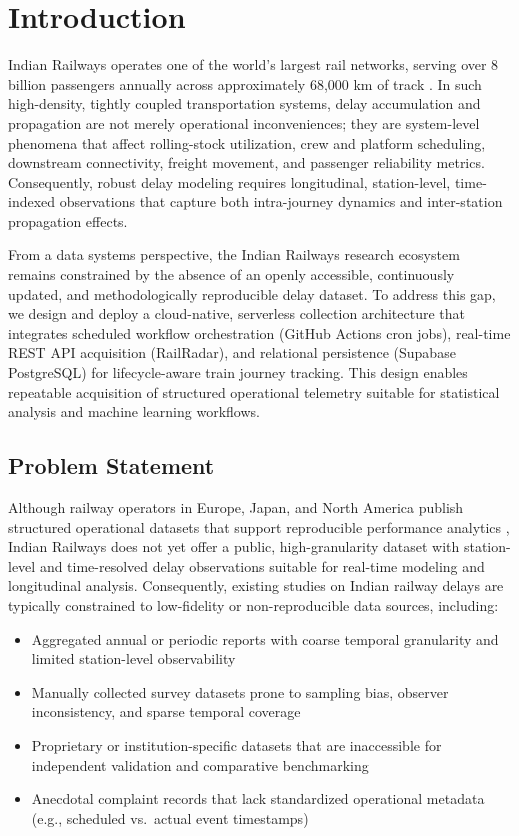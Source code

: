 \documentclass[conference]{IEEEtran}
\begin{document}
\section{Introduction}

Indian Railways operates one of the world's largest rail networks, serving over 8 billion passengers annually across approximately 68,000 km of track \cite{indian_railways_stats}. In such high-density, tightly coupled transportation systems, delay accumulation and propagation are not merely operational inconveniences; they are system-level phenomena that affect rolling-stock utilization, crew and platform scheduling, downstream connectivity, freight movement, and passenger reliability metrics. Consequently, robust delay modeling requires longitudinal, station-level, time-indexed observations that capture both intra-journey dynamics and inter-station propagation effects.

From a data systems perspective, the Indian Railways research ecosystem remains constrained by the absence of an openly accessible, continuously updated, and methodologically reproducible delay dataset. To address this gap, we design and deploy a cloud-native, serverless collection architecture that integrates scheduled workflow orchestration (GitHub Actions cron jobs), real-time REST API acquisition (RailRadar), and relational persistence (Supabase PostgreSQL) for lifecycle-aware train journey tracking. This design enables repeatable acquisition of structured operational telemetry suitable for statistical analysis and machine learning workflows.

\subsection{Problem Statement}

Although railway operators in Europe, Japan, and North America publish structured operational datasets that support reproducible performance analytics \cite{uk_rail_data, german_rail_data}, Indian Railways does not yet offer a public, high-granularity dataset with station-level and time-resolved delay observations suitable for real-time modeling and longitudinal analysis. Consequently, existing studies on Indian railway delays are typically constrained to low-fidelity or non-reproducible data sources, including:

\begin{itemize}
    \item Aggregated annual or periodic reports with coarse temporal granularity and limited station-level observability
    \item Manually collected survey datasets prone to sampling bias, observer inconsistency, and sparse temporal coverage
    \item Proprietary or institution-specific datasets that are inaccessible for independent validation and comparative benchmarking
    \item Anecdotal complaint records that lack standardized operational metadata (e.g., scheduled vs.\ actual event timestamps)
\end{itemize}
\end{document}
